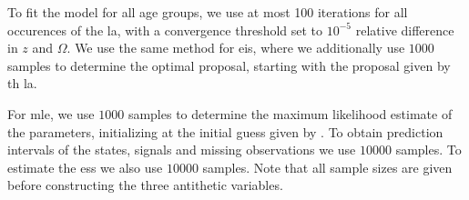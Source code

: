 
To fit the model for all age groups, we use at most \num{ 100 } iterations for all occurences of the \gls{la}, with a convergence threshold set to $10^{-5}$ relative difference in $z$ and $\Omega$. We use the same method for \gls{eis}, where we additionally use $\num{ 1000 }$ samples to determine the optimal proposal, starting with the proposal given by th \gls{la}.

For \gls{mle}, we use $\num{ 1000 }$ samples to determine the maximum likelihood estimate of the parameters, initializing at the initial guess given by .
To obtain prediction intervals of the states, signals and missing observations we use $\num{ 10000 }$ samples. To estimate the \gls{ess} we also use $\num{ 10000 }$ samples. Note that all sample sizes are given before constructing the three antithetic variables.
